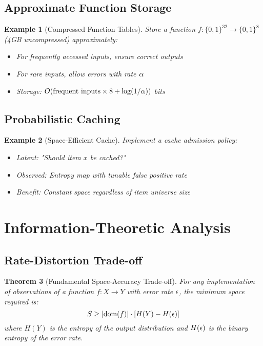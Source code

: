 \documentclass[11pt,final,hidelinks]{article}
\newtheorem{theorem}{Theorem}[section]
\newtheorem{example}[theorem]{Example}
\begin{document}
\subsection{Approximate Function Storage}

\begin{example}[Compressed Function Tables]
Store a function $f: \{0,1\}^{32} \to \{0,1\}^8$ (4GB uncompressed) approximately:
\begin{itemize}
    \item For frequently accessed inputs, ensure correct outputs
    \item For rare inputs, allow errors with rate $\alpha$
    \item Storage: $O(\text{frequent inputs} \times 8 + \log(1/\alpha))$ bits
\end{itemize}
\end{example}

\subsection{Probabilistic Caching}

\begin{example}[Space-Efficient Cache]
Implement a cache admission policy:
\begin{itemize}
    \item Latent: "Should item $x$ be cached?"
    \item Observed: Entropy map with tunable false positive rate
    \item Benefit: Constant space regardless of item universe size
\end{itemize}
\end{example}

\section{Information-Theoretic Analysis}

\subsection{Rate-Distortion Trade-off}

\begin{theorem}[Fundamental Space-Accuracy Trade-off]
For any implementation of observations of a function $f: X \to Y$ with error rate $\epsilon$, the minimum space required is:
\begin{equation}
S \geq \lvert\text{dom}(f)\rvert \cdot [H(Y) - H(\epsilon)]
\end{equation}
where $H(Y)$ is the entropy of the output distribution and $H(\epsilon)$ is the binary entropy of the error rate.
\end{theorem}
\end{document}
